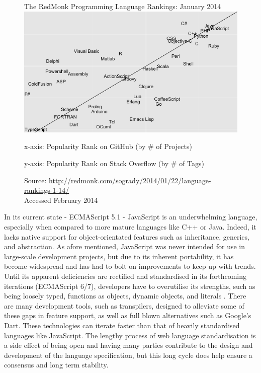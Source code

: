 \documentclass[final]{cmpreport}
\begin{document}

\begin{figure}[h!]{The RedMonk Programming Language Rankings: January 2014 \label{ranking}}
  \includegraphics[width=1.0\textwidth]{lang-rank-114-wm.png}
  \begin{tablenotes}
    \item x-axis: Popularity Rank on GitHub (by \# of Projects)
    \item y-axis: Popularity Rank on Stack Overflow (by \# of Tags)
    \item Source: \url{http://redmonk.com/sogrady/2014/01/22/language-rankings-1-14/}\\Accessed February 2014
  \end{tablenotes}
\end{figure}

 In its current state - ECMAScript 5.1 - JavaScript is an underwhelming language, especially when compared to more mature languages like C++ or Java. Indeed, it lacks native support for object-orientated features such as inheritance, generics, and abstraction. As afore mentioned, JavaScript was never intended for use in large-scale development projects, but due to its inherent portability, it has become widespread and has had to bolt on improvements to keep up with trends. Until its apparent deficiencies are rectified and standardised in its forthcoming iterations (ECMAScript 6/7), developers have to overutilise its strengths, such as being loosely typed, functions as objects, dynamic objects, and literals \citep{Julian}. There are many development tools, such as transpilers, designed to alleviate some of these gaps in feature support, as well as full blown alternatives such as Google's Dart. These technologies can iterate faster than that of heavily standardised languages like JavaScript. The lengthy process of web language standardisation is a side effect of being open and having many parties contribute to the design and development of the language specification, but this long cycle does help ensure a consensus and long term stability.
\end{document}
